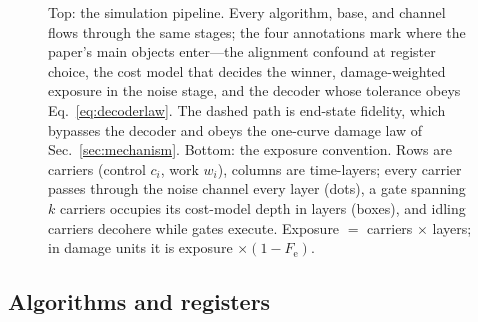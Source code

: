 \documentclass[aps,pra,reprint,superscriptaddress,nofootinbib,floatfix]{revtex4-2}
\newcommand{\Fe}{F_{\mathrm{e}}}
\begin{document}
\begin{figure}[t]
\vspace{5pt}

\caption{Top: the simulation pipeline. Every algorithm, base, and
channel flows through the same stages; the four annotations mark where
the paper's main objects enter---the alignment confound at register
choice, the cost model that decides the winner, damage-weighted
exposure in the noise stage, and the decoder whose tolerance obeys
Eq.~\eqref{eq:decoderlaw}. The dashed path is end-state fidelity,
which bypasses the decoder and obeys the one-curve damage law of
Sec.~\ref{sec:mechanism}. Bottom: the exposure convention. Rows are
carriers (control $c_i$, work $w_i$), columns are time-layers; every
carrier passes through the noise channel every layer (dots), a gate
spanning $k$ carriers occupies its cost-model depth in layers (boxes),
and idling carriers decohere while gates execute. Exposure $=$
carriers $\times$ layers; in damage units it is exposure
$\times(1-\Fe)$.}
\label{fig:pipeline}
\end{figure}

\subsection{Algorithms and registers}
\end{document}
